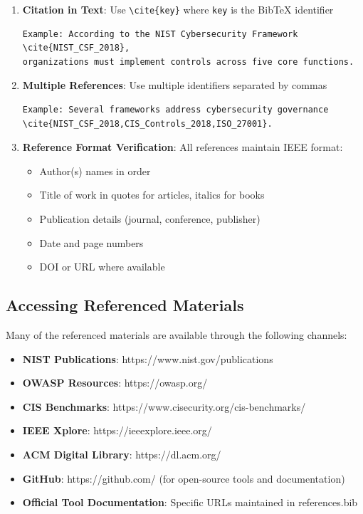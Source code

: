 \begin{enumerate}

\item \textbf{Citation in Text}: Use \verb|\cite{key}| where \texttt{key} is the BibTeX identifier
\begin{verbatim}
Example: According to the NIST Cybersecurity Framework \cite{NIST_CSF_2018},
organizations must implement controls across five core functions.
\end{verbatim}

\item \textbf{Multiple References}: Use multiple identifiers separated by commas
\begin{verbatim}
Example: Several frameworks address cybersecurity governance \cite{NIST_CSF_2018,CIS_Controls_2018,ISO_27001}.
\end{verbatim}

\item \textbf{Reference Format Verification}: All references maintain IEEE format:
\begin{itemize}
\item Author(s) names in order
\item Title of work in quotes for articles, italics for books
\item Publication details (journal, conference, publisher)
\item Date and page numbers
\item DOI or URL where available
\end{itemize}

\end{enumerate}

\subsection{Accessing Referenced Materials}

Many of the referenced materials are available through the following channels:

\begin{itemize}

\item \textbf{NIST Publications}: https://www.nist.gov/publications
\item \textbf{OWASP Resources}: https://owasp.org/
\item \textbf{CIS Benchmarks}: https://www.cisecurity.org/cis-benchmarks/
\item \textbf{IEEE Xplore}: https://ieeexplore.ieee.org/
\item \textbf{ACM Digital Library}: https://dl.acm.org/
\item \textbf{GitHub}: https://github.com/ (for open-source tools and documentation)
\item \textbf{Official Tool Documentation}: Specific URLs maintained in references.bib

\end{itemize}